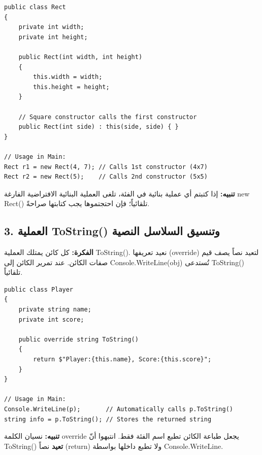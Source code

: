 \documentclass[14pt]{extarticle}
\begin{document}
\begin{boxCode}
\begin{english}
\begin{verbatim}
public class Rect
{
    private int width;
    private int height;

    public Rect(int width, int height)
    {
        this.width = width;
        this.height = height;
    }

    // Square constructor calls the first constructor
    public Rect(int side) : this(side, side) { }
}

// Usage in Main:
Rect r1 = new Rect(4, 7); // Calls 1st constructor (4x7)
Rect r2 = new Rect(5);    // Calls 2nd constructor (5x5)
\end{verbatim}
\end{english}
\end{boxCode}

\textbf{تنبيه:} إذا كتبتم أي عملية بنائية في الفئة، تلغى العملية البنائية الافتراضية الفارغة \textenglish{new Rect()} تلقائياً؛ فإن احتجتموها يجب كتابتها صراحةً.

\filbreak
\subsection*{3. العملية \textenglish{ToString()} وتنسيق السلاسل النصية}
\textbf{الفكرة:} كل كائن يمتلك العملية \textenglish{ToString()}. نعيد تعريفها (\textenglish{override}) لتعيد نصاً يصف قيم صفات الكائن. عند تمرير الكائن إلى \textenglish{Console.WriteLine(obj)} تُستدعى \textenglish{ToString()} تلقائياً.

\begin{boxCode}
\begin{english}
\begin{verbatim}
public class Player
{
    private string name;
    private int score;

    public override string ToString()
    {
        return $"Player:{this.name}, Score:{this.score}";
    }
}

// Usage in Main:
Console.WriteLine(p);       // Automatically calls p.ToString()
string info = p.ToString(); // Stores the returned string
\end{verbatim}
\end{english}
\end{boxCode}

\textbf{تنبيه:} نسيان الكلمة \textenglish{override} يجعل طباعة الكائن تطبع اسم الفئة فقط. انتبهوا أنّ \textenglish{ToString()} \textbf{تعيد} نصاً (\textenglish{return}) ولا تطبع داخلها بواسطة \textenglish{Console.WriteLine}.
\end{document}
